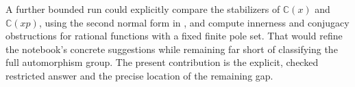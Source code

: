 A further bounded run could explicitly compare the stabilizers of
\(\mathbb C(x)\) and \(\mathbb C(xp)\), using the second normal form in
\citet[Proposition 2.2(ii)]{alevdumas1998invariants}, and compute innerness
and conjugacy obstructions for rational functions with a fixed finite pole
set. That would refine the notebook's concrete suggestions while remaining
far short of classifying the full automorphism group. The present contribution
is the explicit, checked restricted answer and the precise location of the
remaining gap.

